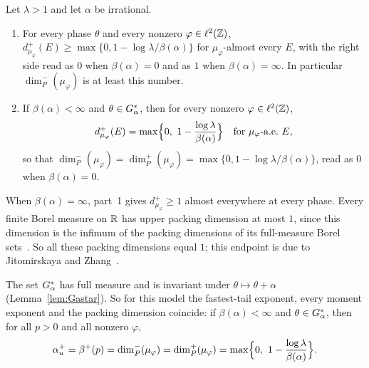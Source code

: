 \begin{maintheorem}\label{thm:C}
Let $\lambda>1$ and let $\alpha$ be irrational.
\begin{enumerate}
\item For every phase $\theta$ and every nonzero $\varphi\in\ell^2(\mathbb Z)$, $d^+_{\mu_\varphi}(E)\ge\max\{0,1-\log\lambda/\beta(\alpha)\}$ for $\mu_\varphi$-almost every $E$, with the right side read as $0$ when $\beta(\alpha)=0$ and as $1$ when $\beta(\alpha)=\infty$. In particular $\dim_P^-(\mu_\varphi)$ is at least this number.
\item If $\beta(\alpha)<\infty$ and $\theta\in G_\alpha^*$, then for every nonzero $\varphi\in\ell^2(\mathbb Z)$,
\[
d^+_{\mu_\varphi}(E)=\max\Bigl\{0,\ 1-\frac{\log\lambda}{\beta(\alpha)}\Bigr\}\quad\text{for $\mu_\varphi$-a.e.\ $E$},
\]
so that $\dim_P^-(\mu_\varphi)=\dim_P^+(\mu_\varphi)=\max\{0,1-\log\lambda/\beta(\alpha)\}$, read as $0$ when $\beta(\alpha)=0$.
\end{enumerate}
\end{maintheorem}

When $\beta(\alpha)=\infty$, part~1 gives $d^+_{\mu_\varphi}\ge1$ almost everywhere at every phase. Every finite Borel measure on $\mathbb R$ has upper packing dimension at most $1$, since this dimension is the infimum of the packing dimensions of its full-measure Borel sets~\cite[Appendix]{GSB1999}. So all these packing dimensions equal $1$; this endpoint is due to Jitomirskaya and Zhang~\cite[Corollary~3]{JZ2022}.

The set $G_\alpha^*$ has full measure and is invariant under $\theta\mapsto\theta+\alpha$ (Lemma~\ref{lem:Gastar}). So for this model the fastest-tail exponent, every moment exponent and the packing dimension coincide: if $\beta(\alpha)<\infty$ and $\theta\in G_\alpha^*$, then for all $p>0$ and all nonzero $\varphi$,
\[
\au=\beta^+(p)=\dim_P^-(\mu_\varphi)=\dim_P^+(\mu_\varphi)=\max\Bigl\{0,\ 1-\frac{\log\lambda}{\beta(\alpha)}\Bigr\}.
\]

